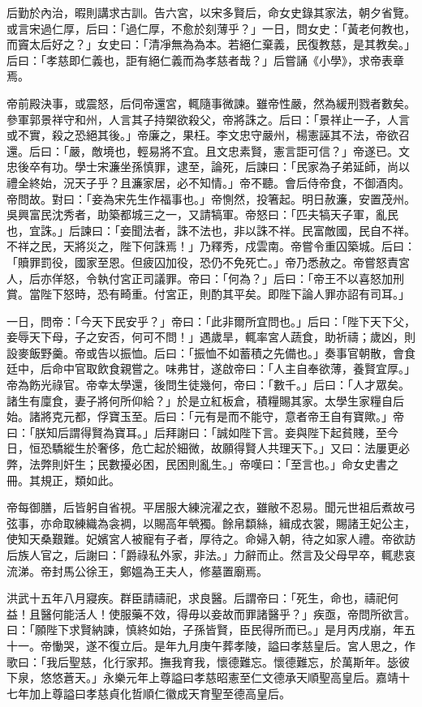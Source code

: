 后勤於內治，暇則講求古訓。告六宮，以宋多賢后，命女史錄其家法，朝夕省覽。或言宋過仁厚，后曰：「過仁厚，不愈於刻薄乎？」一日，問女史：「黃老何教也，而竇太后好之？」女史曰：「清凈無為為本。若絕仁棄義，民復教慈，是其教矣。」后曰：「孝慈即仁義也，詎有絕仁義而為孝慈者哉？」后嘗誦《小學》，求帝表章焉。

帝前殿決事，或震怒，后伺帝還宮，輒隨事微諫。雖帝性嚴，然為緩刑戮者數矣。參軍郭景祥守和州，人言其子持槊欲殺父，帝將誅之。后曰：「景祥止一子，人言或不實，殺之恐絕其後。」帝廉之，果枉。李文忠守嚴州，楊憲誣其不法，帝欲召還。后曰：「嚴，敵境也，輕易將不宜。且文忠素賢，憲言詎可信？」帝遂已。文忠後卒有功。學士宋濂坐孫慎罪，逮至，論死，后諫曰：「民家為子弟延師，尚以禮全終始，況天子乎？且濂家居，必不知情。」帝不聽。會后侍帝食，不御酒肉。帝問故。對曰：「妾為宋先生作福事也。」帝惻然，投箸起。明日赦濂，安置茂州。吳興富民沈秀者，助築都城三之一，又請犒軍。帝怒曰：「匹夫犒天子軍，亂民也，宜誅。」后諫曰：「妾聞法者，誅不法也，非以誅不祥。民富敵國，民自不祥。不祥之民，天將災之，陛下何誅焉！」乃釋秀，戍雲南。帝嘗令重囚築城。后曰：「贖罪罰役，國家至恩。但疲囚加役，恐仍不免死亡。」帝乃悉赦之。帝嘗怒責宮人，后亦佯怒，令執付宮正司議罪。帝曰：「何為？」后曰：「帝王不以喜怒加刑賞。當陛下怒時，恐有畸重。付宮正，則酌其平矣。即陛下論人罪亦詔有司耳。」

一日，問帝：「今天下民安乎？」帝曰：「此非爾所宜問也。」后曰：「陛下天下父，妾辱天下母，子之安否，何可不問！」遇歲旱，輒率宮人蔬食，助祈禱；歲凶，則設麥飯野羹。帝或告以振恤。后曰：「振恤不如蓄積之先備也。」奏事官朝散，會食廷中，后命中官取飲食親嘗之。味弗甘，遂啟帝曰：「人主自奉欲薄，養賢宜厚。」帝為飭光祿官。帝幸太學還，後問生徒幾何，帝曰：「數千。」后曰：「人才眾矣。諸生有廩食，妻子將何所仰給？」於是立紅板倉，積糧賜其家。太學生家糧自后始。諸將克元都，俘寶玉至。后曰：「元有是而不能守，意者帝王自有寶歟。」帝曰：「朕知后謂得賢為寶耳。」后拜謝曰：「誠如陛下言。妾與陛下起貧賤，至今日，恒恐驕縱生於奢侈，危亡起於細微，故願得賢人共理天下。」又曰：法屢更必弊，法弊則奸生；民數擾必困，民困則亂生。」帝嘆曰：「至言也。」命女史書之冊。其規正，類如此。

帝每御膳，后皆躬自省視。平居服大練浣濯之衣，雖敝不忍易。聞元世祖后煮故弓弦事，亦命取練織為衾裯，以賜高年煢獨。餘帛纇絲，緝成衣裳，賜諸王妃公主，使知天桑艱難。妃嬪宮人被寵有子者，厚待之。命婦入朝，待之如家人禮。帝欲訪后族人官之，后謝曰：「爵祿私外家，非法。」力辭而止。然言及父母早卒，輒悲哀流涕。帝封馬公徐王，鄭媼為王夫人，修墓置廟焉。

洪武十五年八月寢疾。群臣請禱祀，求良醫。后謂帝曰：「死生，命也，禱祀何益！且醫何能活人！使服藥不效，得毋以妾故而罪諸醫乎？」疾亟，帝問所欲言。曰：「願陛下求賢納諫，慎終如始，子孫皆賢，臣民得所而已。」是月丙戌崩，年五十一。帝慟哭，遂不復立后。是年九月庚午葬孝陵，謚曰孝慈皇后。宮人思之，作歌曰：「我后聖慈，化行家邦。撫我育我，懷德難忘。懷德難忘，於萬斯年。毖彼下泉，悠悠蒼天。」永樂元年上尊謚曰孝慈昭憲至仁文德承天順聖高皇后。嘉靖十七年加上尊謚曰孝慈貞化哲順仁徽成天育聖至德高皇后。

